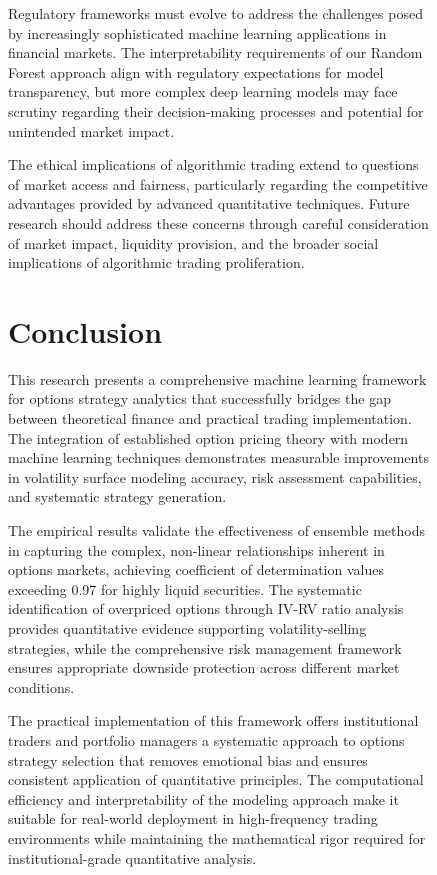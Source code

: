 \documentclass[12pt,a4paper]{article}
\begin{document}
\begin{figure}[H]
Regulatory frameworks must evolve to address the challenges posed by increasingly sophisticated machine learning applications in financial markets. The interpretability requirements of our Random Forest approach align with regulatory expectations for model transparency, but more complex deep learning models may face scrutiny regarding their decision-making processes and potential for unintended market impact.

The ethical implications of algorithmic trading extend to questions of market access and fairness, particularly regarding the competitive advantages provided by advanced quantitative techniques. Future research should address these concerns through careful consideration of market impact, liquidity provision, and the broader social implications of algorithmic trading proliferation.

\section{Conclusion}

This research presents a comprehensive machine learning framework for options strategy analytics that successfully bridges the gap between theoretical finance and practical trading implementation. The integration of established option pricing theory with modern machine learning techniques demonstrates measurable improvements in volatility surface modeling accuracy, risk assessment capabilities, and systematic strategy generation.

The empirical results validate the effectiveness of ensemble methods in capturing the complex, non-linear relationships inherent in options markets, achieving coefficient of determination values exceeding 0.97 for highly liquid securities. The systematic identification of overpriced options through IV-RV ratio analysis provides quantitative evidence supporting volatility-selling strategies, while the comprehensive risk management framework ensures appropriate downside protection across different market conditions.

The practical implementation of this framework offers institutional traders and portfolio managers a systematic approach to options strategy selection that removes emotional bias and ensures consistent application of quantitative principles. The computational efficiency and interpretability of the modeling approach make it suitable for real-world deployment in high-frequency trading environments while maintaining the mathematical rigor required for institutional-grade quantitative analysis.


\end{figure}
\end{document}

